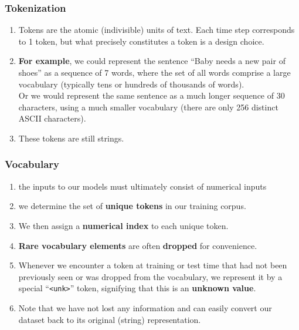 \subsubsection{Tokenization \cite{dnn-1}}

\begin{enumerate}
    \item Tokens are the atomic (indivisible) units of text. Each time step corresponds to 1 token, but what precisely constitutes a token is a design choice. 
    
    \item \textbf{For example}, we could represent the sentence “Baby needs a new pair of shoes” as a sequence of 7 words, where the set of all words comprise a large vocabulary (typically tens or hundreds of thousands of words).\\
    Or we would represent the same sentence as a much longer sequence of 30 characters, using a much smaller vocabulary (there are only 256 distinct ASCII characters).

    \item These tokens are still strings.

\end{enumerate}

\subsubsection{Vocabulary \cite{dnn-1}}

\begin{enumerate}
    \item the inputs to our models must ultimately consist of numerical inputs

    \item we determine the set of \textbf{unique tokens} in our training corpus. 
    
    \item We then assign a \textbf{numerical index} to each unique token. 
    
    \item \textbf{Rare vocabulary elements} are often \textbf{dropped} for convenience. 
    
    \item Whenever we encounter a token at training or test time that had not been previously seen or was dropped from the vocabulary, we represent it by a special “\verb|<unk>|” token, signifying that this is an \textbf{unknown value}.

    \item Note that we have not lost any information and can easily convert our dataset back to its original (string) representation.

\end{enumerate}

















